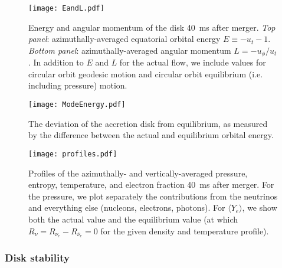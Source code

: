 \begin{figure}
\texttt{[image: EandL.pdf]}
\caption{
Energy and angular momentum of the disk 40~ms after merger.
{\em Top panel}: azimuthally-averaged equatorial orbital energy
$E\equiv-u_t-1$.
{\em Bottom panel}: azimuthally-averaged angular momentum
$L=-u_{\phi}/u_{t}$.
In addition to $E$ and $L$ for the
actual flow, we include values for circular orbit geodesic motion and
circular orbit equilibrium (i.e. including pressure) motion.
}
\label{fig:equilibrium}
\end{figure}

\begin{figure}
\texttt{[image: ModeEnergy.pdf]}
\caption{The deviation of the accretion disk from
equilibrium, as measured by the difference between the
actual and equilibrium orbital energy.}
\label{fig:mode}
\end{figure}

\begin{figure}
\texttt{[image: profiles.pdf]}
\caption{
Profiles of the azimuthally- and vertically-averaged pressure, entropy, temperature, and
electron fraction 40~ms after merger. For the pressure, we plot separately
the contributions from the neutrinos and everything else (nucleons,
electrons, photons).  For $\langle Y_e \rangle$, we show both the actual value and the
equilibrium value (at which $R_{\nu}=R_{\nu_e}-R_{\overline{\nu}_e}=0$ for the
given density and temperature profile).
}
\label{fig:profiles}
\end{figure}

\subsubsection{Disk stability}

